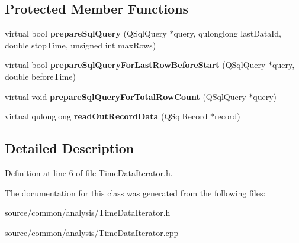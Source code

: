 \subsection*{Protected Member Functions}
\begin{DoxyCompactItemize}
\item 
\hypertarget{class_picto_1_1_time_data_iterator_a7b29ae0f97c161f98e49fcdecc47cb32}{virtual bool {\bfseries prepare\-Sql\-Query} (Q\-Sql\-Query $\ast$query, qulonglong last\-Data\-Id, double stop\-Time, unsigned int max\-Rows)}\label{class_picto_1_1_time_data_iterator_a7b29ae0f97c161f98e49fcdecc47cb32}

\item 
\hypertarget{class_picto_1_1_time_data_iterator_a0106ebfa4787c764ccee0623a22ef1c1}{virtual bool {\bfseries prepare\-Sql\-Query\-For\-Last\-Row\-Before\-Start} (Q\-Sql\-Query $\ast$query, double before\-Time)}\label{class_picto_1_1_time_data_iterator_a0106ebfa4787c764ccee0623a22ef1c1}

\item 
\hypertarget{class_picto_1_1_time_data_iterator_aab74ff2f13032df5133a72355e296088}{virtual void {\bfseries prepare\-Sql\-Query\-For\-Total\-Row\-Count} (Q\-Sql\-Query $\ast$query)}\label{class_picto_1_1_time_data_iterator_aab74ff2f13032df5133a72355e296088}

\item 
\hypertarget{class_picto_1_1_time_data_iterator_a76c49323106f70678146c35f4c5345eb}{virtual qulonglong {\bfseries read\-Out\-Record\-Data} (Q\-Sql\-Record $\ast$record)}\label{class_picto_1_1_time_data_iterator_a76c49323106f70678146c35f4c5345eb}

\end{DoxyCompactItemize}


\subsection{Detailed Description}


Definition at line 6 of file Time\-Data\-Iterator.\-h.



The documentation for this class was generated from the following files\-:\begin{DoxyCompactItemize}
\item 
source/common/analysis/Time\-Data\-Iterator.\-h\item 
source/common/analysis/Time\-Data\-Iterator.\-cpp\end{DoxyCompactItemize}
